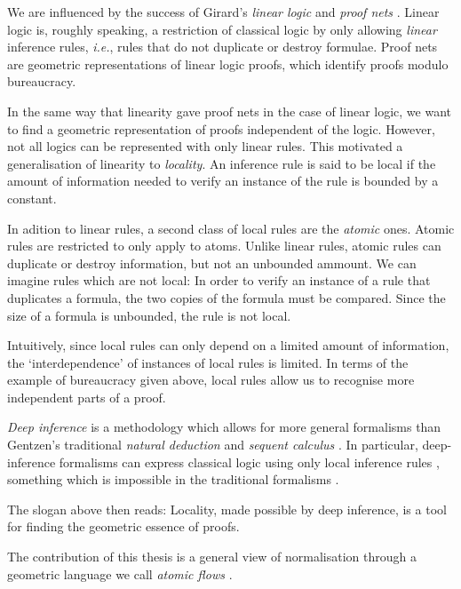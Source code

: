 
We are influenced by the success of Girard's \emph{linear logic} and \emph{proof nets} \cite{Gira:87:Linear-L:wm}. Linear logic is, roughly speaking, a restriction of classical logic by only allowing \emph{linear} inference rules, \emph{i.e.}, rules that do not duplicate or destroy formulae. Proof nets are geometric representations of linear logic proofs, which identify proofs modulo bureaucracy.

In the same way that linearity gave proof nets in the case of linear logic, we want to find a geometric representation of proofs independent of the logic. However, not all logics can be represented with only linear rules. This motivated a generalisation of linearity to \emph{locality}. An inference rule is said to be local if the amount of information needed to verify an instance of the rule is bounded by a constant.

In adition to linear rules, a second class of local rules are the \emph{atomic} ones. Atomic rules are restricted to only apply to atoms. Unlike linear rules, atomic rules can duplicate or destroy information, but not an unbounded ammount. We can imagine rules which are not local: In order to verify an instance of a rule that duplicates a formula, the two copies of the formula must be compared. Since the size of a formula is unbounded, the rule is not local.

Intuitively, since local rules can only depend on a limited amount of information, the `interdependence' of instances of local rules is limited. In terms of the example of bureaucracy given above, local rules allow us to recognise more independent parts of a proof.

\emph{Deep inference} \cite{Gugl:06:A-System:kl} is a methodology which allows for more general formalisms than Gentzen's traditional \emph{natural deduction} and \emph{sequent calculus} \cite{Gent:69:Investig:xi}. In particular, deep-inference formalisms can express classical logic using only local inference rules \cite{BrunTiu:01:A-Local-:mz}, something which is impossible in the traditional formalisms \cite{Brun:03:Two-Rest:mn}.

The slogan above then reads: Locality, made possible by deep inference, is a tool for finding the geometric essence of proofs.

The contribution of this thesis is a general view of normalisation through a geometric language we call \emph{atomic flows} \cite{GuglGund:07:Normalis:lr}.

